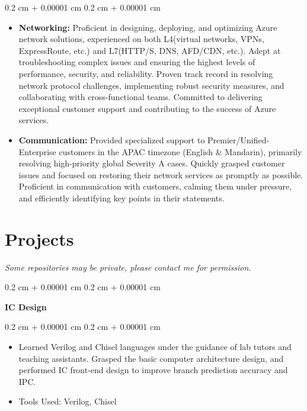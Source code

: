 \documentclass[10pt, letterpaper]{article}
\newenvironment{highlights}{
    \begin{itemize}[
        topsep=0.10 cm,
        parsep=0.10 cm,
        partopsep=0pt,
        itemsep=0pt,
        leftmargin=0.4 cm + 10pt
    ]
}{
    \end{itemize}
} %
\newenvironment{onecolentry}{
    \begin{adjustwidth}{
        0.2 cm + 0.00001 cm
    }{
        0.2 cm + 0.00001 cm
    }
}{
    \end{adjustwidth}
} %
\newenvironment{twocolentry}[2][]{
    \onecolentry
    \def\secondColumn{#2}
    \setcolumnwidth{\fill, 4.5 cm}
    \begin{paracol}{2}
}{
    \switchcolumn \raggedleft \secondColumn
    \end{paracol}
    \endonecolentry
} %
\let\hrefWithoutArrow\href
\renewcommand{\href}[2]{\hrefWithoutArrow{#1}{\ifthenelse{\equal{#2}{}}{ }{#2 }\raisebox{.15ex}{\footnotesize \faExternalLink*}}}
\begin{document}
        \vspace{0.10 cm}
        \begin{onecolentry}
            \begin{highlights}
                \item  \textbf{Networking:} Proficient in designing, deploying, and optimizing Azure network solutions, experienced on both
L4(virtual networks, VPNs, ExpressRoute, etc.) and L7(HTTP/S, DNS, AFD/CDN, etc.). Adept at
troubleshooting complex issues and ensuring the highest levels of performance, security, and reliability. Proven
track record in resolving network protocol challenges, implementing robust security measures, and collaborating
with cross-functional teams. Committed to delivering exceptional customer support and contributing to the success
of Azure services.
                \item \textbf{Communication:} Provided specialized support to Premier/Unified-Enterprise customers in the APAC timezone
(English \& Mandarin), primarily resolving high-priority global Severity A cases. Quickly grasped customer issues
and focused on restoring their network services as promptly as possible. Proficient in communication with
customers, calming them under pressure, and efficiently identifying key points in their statements.
            \end{highlights}
        \end{onecolentry}





        \section{Projects}
        \textit{\fontsize{7 pt}{7 pt}\selectfont *Some repositories may be private, please contact me for permission.}
        
        \begin{twocolentry}{
        \textit{\href{https://git.lyrance.com:555/Lyrance/ysyx}{Git repo(Private)}}}
            \textbf{IC Design}
        \end{twocolentry}

        \vspace{0.10 cm}
        \begin{onecolentry}
            \begin{highlights}
                \item Learned Verilog and Chisel languages under the guidance of lab tutors and teaching assistants.
Grasped the basic computer architecture design, and performed IC front-end design to improve branch prediction
accuracy and IPC.
                \item Tools Used: Verilog, Chisel
            \end{highlights}
        \end{onecolentry}
\end{document}
